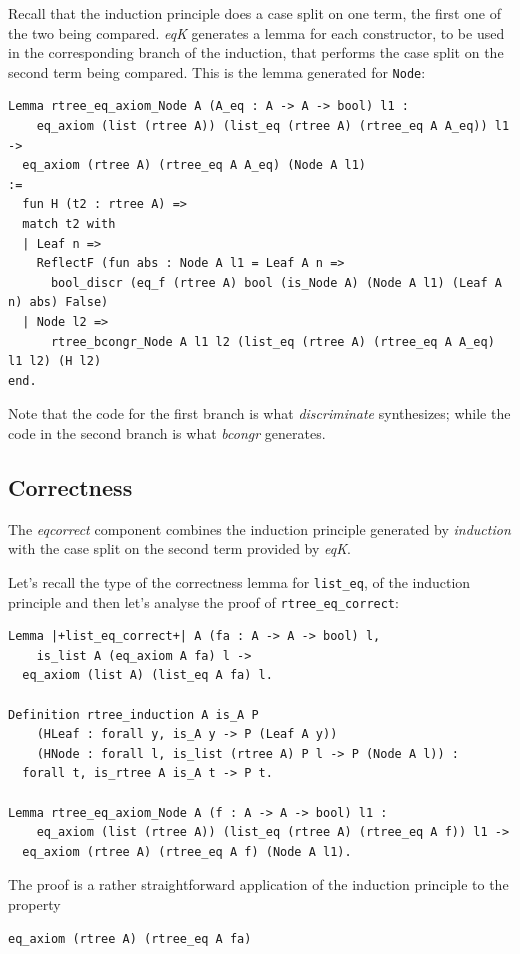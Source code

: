 \documentclass[a4paper,UKenglish,cleveref, autoref]{lipics-v2019}
\newcommand{\derive}[1]{\emph{#1}}
\begin{document}
Recall that the induction principle does a case split on one term, the first
one of the two being compared.  \derive{eqK} generates a lemma for each
constructor, to be used in the corresponding branch of the induction, that
performs the case split on the second term being compared.  This is the lemma
generated for \lstinline+Node+:
\begin{lstlisting}
Lemma rtree_eq_axiom_Node A (A_eq : A -> A -> bool) l1 :
    eq_axiom (list (rtree A)) (list_eq (rtree A) (rtree_eq A A_eq)) l1 ->
  eq_axiom (rtree A) (rtree_eq A A_eq) (Node A l1)
:=
  fun H (t2 : rtree A) =>
  match t2 with
  | Leaf n =>
    ReflectF (fun abs : Node A l1 = Leaf A n =>
      bool_discr (eq_f (rtree A) bool (is_Node A) (Node A l1) (Leaf A n) abs) False)
  | Node l2 =>
      rtree_bcongr_Node A l1 l2 (list_eq (rtree A) (rtree_eq A A_eq) l1 l2) (H l2)
end.
\end{lstlisting}

\noindent
Note that the code for the first branch is what
\derive{discriminate} synthesizes; while the code
in the second branch is what \derive{bcongr} generates.

\subsection{Correctness} %
\label{sec:derive:eqcorrect}

The \derive{eqcorrect} component combines the induction
principle generated by \derive{induction} with the
case split on the second term provided by \derive{eqK}.

Let's recall the type of the correctness lemma for
\lstinline+list_eq+, of the induction principle
and then let's analyse the proof of
\lstinline+rtree_eq_correct+:
\begin{lstlisting}
Lemma |+list_eq_correct+| A (fa : A -> A -> bool) l,
    is_list A (eq_axiom A fa) l ->
  eq_axiom (list A) (list_eq A fa) l.

Definition rtree_induction A is_A P  
    (HLeaf : forall y, is_A y -> P (Leaf A y))
    (HNode : forall l, is_list (rtree A) P l -> P (Node A l)) :
  forall t, is_rtree A is_A t -> P t.

Lemma rtree_eq_axiom_Node A (f : A -> A -> bool) l1 :
    eq_axiom (list (rtree A)) (list_eq (rtree A) (rtree_eq A f)) l1 ->
  eq_axiom (rtree A) (rtree_eq A f) (Node A l1).
\end{lstlisting}
       
\noindent
The proof is a rather straightforward application
of the induction principle to the property
\begin{lstlisting}
eq_axiom (rtree A) (rtree_eq A fa)
\end{lstlisting}
\end{document}
